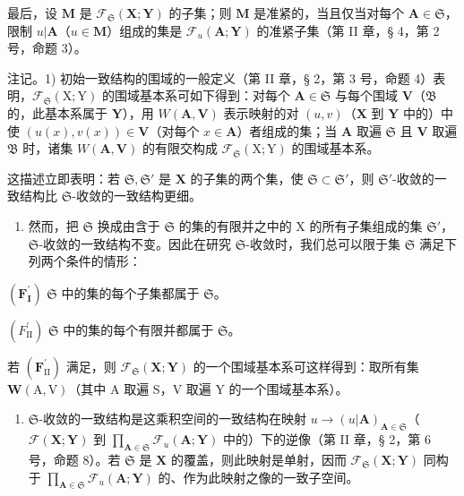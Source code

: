 最后，设 \(\mathbf{M}\) 是 \(\mathcal{F}_{\mathfrak{S}}(\mathbf{X};\mathbf{Y})\) 的子集；则 \(\mathbf{M}\) 是准紧的，当且仅当对每个 \(\mathbf{A} \in \mathfrak{S}\)，限制 \(u|\mathbf{A}\)（\(u \in \mathbf{M}\)）组成的集是 \(\mathcal{F}_u(\mathbf{A};\mathbf{Y})\) 的准紧子集（第 II 章，§ 4，第 2 号，命题 3）。

注记。1) 初始一致结构的围域的一般定义（第 II 章，§ 2，第 3 号，命题 4）表明，\(\mathcal{F}_{\mathfrak{S}}(\mathrm{X};\mathrm{Y})\) 的围域基本系可如下得到：对每个 \(\mathbf{A}\in \mathfrak{S}\) 与每个围域 \(\mathbf{V}\)（\(\mathfrak{B}\) 的，此基本系属于 \(\mathbf{Y}\)），用 \(W(\mathbf{A},\mathbf{V})\) 表示映射的对 \((u,v)\)（\(\mathbf{X}\) 到 \(\mathbf{Y}\) 中的）中使 \((u(x),v(x))\in \mathbf{V}\)（对每个 \(x\in \mathbf{A}\)）者组成的集；当 \(\mathbf{A}\) 取遍 \(\mathfrak{S}\) 且 \(\mathbf{V}\) 取遍 \(\mathfrak{B}\) 时，诸集 \(W(\mathbf{A},\mathbf{V})\) 的有限交构成 \(\mathcal{F}_{\mathfrak{S}}(\mathrm{X};\mathrm{Y})\) 的围域基本系。

这描述立即表明：若 \(\mathfrak{S},\mathfrak{S}'\) 是 \(\mathbf{X}\) 的子集的两个集，使 \(\mathfrak{S} \subset \mathfrak{S}'\)，则 \(\mathfrak{S}'\)-收敛的一致结构比 \(\mathfrak{S}\)-收敛的一致结构更细。

\begin{enumerate}
\def\labelenumi{\arabic{enumi})}
\setcounter{enumi}{1}
\tightlist
\item
  然而，把 \(\mathfrak{S}\) 换成由含于 \(\mathfrak{S}\) 的集的有限并之中的 X 的所有子集组成的集 \(\mathfrak{S}'\)，\(\mathfrak{S}\)-收敛的一致结构不变。因此在研究 \(\mathfrak{S}\)-收敛时，我们总可以限于集 \(\mathfrak{S}\) 满足下列两个条件的情形：
\end{enumerate}

\((\mathbf{F}_{\mathbf{I}}^{\prime})\) \(\mathfrak{S}\) 中的集的每个子集都属于 \(\mathfrak{S}\)。

\((F_{\mathrm{II}}^{\prime})\) \(\mathfrak{S}\) 中的集的每个有限并都属于 \(\mathfrak{S}\)。

若 \((\mathbf{F}_{\mathrm{II}}^{\prime})\) 满足，则 \(\mathcal{F}_{\mathfrak{S}}(\mathbf{X};\mathbf{Y})\) 的一个围域基本系可这样得到：取所有集 \(\boldsymbol{W}(\mathrm{A},\mathrm{V})\)（其中 A 取遍 S，V 取遍 Y 的一个围域基本系）。

\begin{enumerate}
\def\labelenumi{\arabic{enumi})}
\setcounter{enumi}{2}
\tightlist
\item
  \(\mathfrak{S}\)-收敛的一致结构是这乘积空间的一致结构在映射 \(u \to (u|\mathbf{A})_{\mathbf{A} \in \mathfrak{S}}\)（\(\mathcal{F}(\mathbf{X}; \mathbf{Y})\) 到 \(\prod_{\mathbf{A} \in \mathfrak{S}} \mathcal{F}_u(\mathbf{A}; \mathbf{Y})\) 中的）下的逆像（第 II 章，§ 2，第 6 号，命题 8）。若 \(\mathfrak{S}\) 是 \(\mathbf{X}\) 的覆盖，则此映射是单射，因而 \(\mathcal{F}_{\mathfrak{S}}(\mathbf{X}; \mathbf{Y})\) 同构于 \(\prod_{\mathbf{A} \in \mathfrak{S}} \mathcal{F}_u(\mathbf{A}; \mathbf{Y})\) 的、作为此映射之像的一致子空间。
\end{enumerate}

